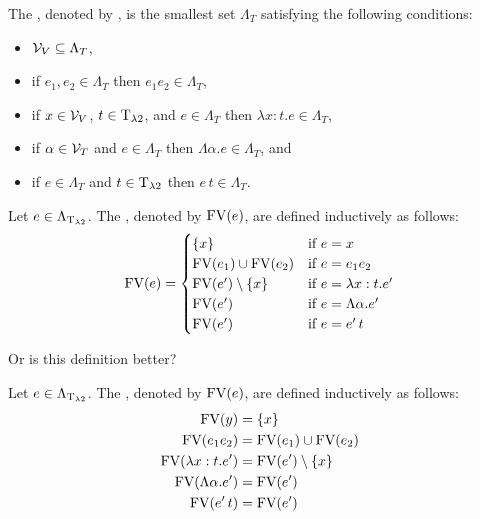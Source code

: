 \begin{definition}
	The , denoted by \lambdaTerms{}, is the smallest set $\Lambda_T$ satisfying the following conditions: %
	\begin{itemize}
		\item $\mathcal{V}_V\subseteq\Lambda_T$,
		\item if $e_1,e_2\in\Lambda_T$ then $e_1e_2\in\Lambda_T$,
		\item if $x\in\mathcal{V}_V$, $t\in\text{T}_{\lambda2}$, and $e\in\Lambda_T$ then $\lambda x:t.e\in\Lambda_T$,
		\item if $\alpha\in\mathcal{V}_T$ and $e\in\Lambda_T$ then $\Lambda \alpha.e\in\Lambda_T$, and
		\item if $e\in\Lambda_T$ and $t\in\text{T}_{\lambda2}$ then $e\,t\in\Lambda_T$.
	\end{itemize}
\end{definition}
\begin{definition}
	Let $e\in\Lambda_{\text{T}_{\lambda2}}$. The , denoted by $\text{FV}(e)$, are defined inductively as follows:
	\[\FV(e)=
		\begin{cases}
			\{x\}                 & \text{if $e=x$}                \\ %
			\FV(e_1)\cup\FV(e_2)  & \text{if $e=e_1e_2$}           \\
			\FV(e')\setminus\{x\} & \text{if $e=\lambda x:t.e'$}   \\
			\FV(e')               & \text{if $e=\Lambda\alpha.e'$} \\
			\FV(e')               & \text{if $e=e'\,t$}            \\
		\end{cases}\]
\end{definition}
Or is this definition better?
\begin{definition}
	Let $e\in\Lambda_{\text{T}_{\lambda2}}$. The , denoted by $\text{FV}(e)$, are defined inductively as follows:
	\begin{align*}
		\text{FV}(y)                & =\{x\}                 \\
		\text{FV}(e_1e_2)           & =\text{FV}(e_1)\cup\text{FV}(e_2)  \\
		\text{FV}(\lambda x:t.e')   & =\text{FV}(e')\setminus\{x\} \\
		\text{FV}(\Lambda\alpha.e') & =\text{FV}(e')               \\
		\text{FV}(e'\,t)            & =\text{FV}(e')               \\
	\end{align*}
\end{definition}
